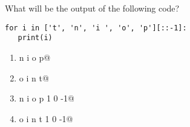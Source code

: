 \question
What will be the output of the following code?

\begin{lstlisting}
for i in ['t', 'n', 'i ', 'o', 'p'][::-1]:
   print(i)
\end{lstlisting}
\begin{enumerate}
\item \lstinline@t n i o p@
\item \lstinline@p o i n t@
\item \lstinline@t n i o p 1 0 -1@
\item \lstinline@p o i n t 1 0 -1@
\end{enumerate}

